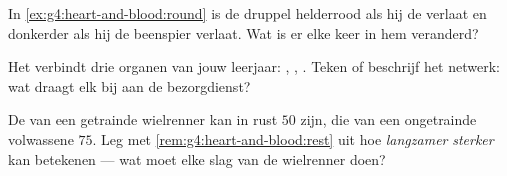\begin{exercise}[$\star\star$]\label{exo:g4:heart-and-blood:9}
In \cref{ex:g4:heart-and-blood:round} is de druppel  helderrood als
hij de  verlaat en donkerder als hij de beenspier verlaat. Wat is
er elke keer in hem veranderd?
\end{exercise}

\begin{exercise}[$\star\star$]\label{exo:g4:heart-and-blood:10}
Het  verbindt drie organen van jouw leerjaar: , ,
. Teken of beschrijf het netwerk: wat draagt elk bij aan de
bezorgdienst?
\end{exercise}

\begin{exercise}[$\star\star\star$]\label{exo:g4:heart-and-blood:11}
De  van een getrainde wielrenner kan in rust $50$ zijn, die van
een ongetrainde volwassene $75$. Leg met
\cref{rem:g4:heart-and-blood:rest} uit hoe \emph{langzamer}
\emph{sterker} kan betekenen --- wat moet elke slag van de wielrenner doen?
\end{exercise}
